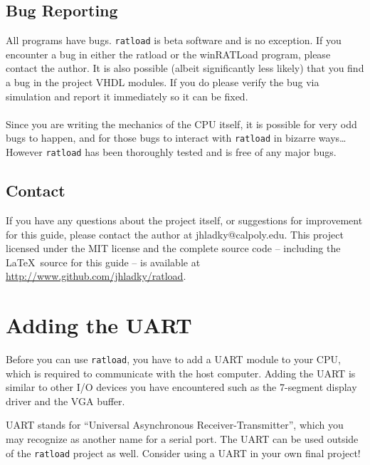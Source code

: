 \documentclass[notitlepage]{article}
\newcommand{\infosign}{\fontencoding{U}\fontfamily{futs}\huge\selectfont\char 116\relax}
\begin{document}
\subsection{Bug Reporting}
All programs have bugs. \texttt{ratload} is beta software and is no exception. If you encounter a bug in either the ratload or the winRATLoad program, please contact the author. It is also possible (albeit significantly less likely) that you find a bug in the project VHDL modules. If you do please verify the bug via simulation and report it immediately so it can be fixed.\\\\
Since you are writing the mechanics of the CPU itself, it is possible for very odd bugs to happen, and for those bugs to interact with \texttt{ratload} in bizarre ways\ldots However \texttt{ratload} has been thoroughly tested and is free of any major bugs.

\subsection{Contact}
If you have any questions about the project itself, or suggestions for improvement for this guide, please contact the author at jhladky@calpoly.edu. This project licensed under the MIT license and the complete source code -- including the \LaTeX ~source for this guide -- is available at \url{http://www.github.com/jhladky/ratload}.


\section{Adding the UART}
Before you can use \texttt{ratload}, you have to add a UART module to your CPU, which is required to communicate with the host computer. Adding the UART is similar to other I/O devices you have encountered such as the 7-segment display driver and the VGA buffer.

\begin{infobox}
  {\infosign} UART stands for ``Universal Asynchronous Receiver-Transmitter'', which you may recognize as another name for a serial port. The UART can be used outside of the \texttt{ratload} project as well. Consider using a UART in your own final project!
\end{infobox}
\end{document}
